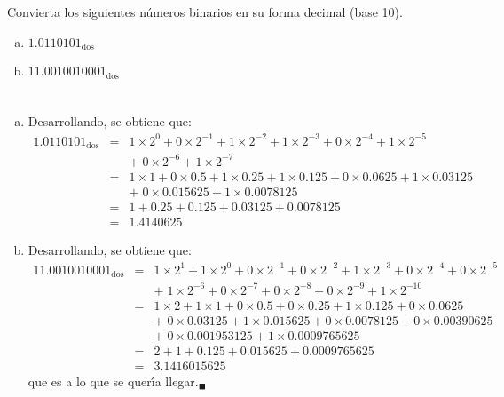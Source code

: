 \begin{enunciado}
 Convierta los siguientes n\'umeros binarios en su forma decimal (base 10).
 \begin{multicols}{2}
  \begin{enumerate}[(a)]
   \item $1.0110101_{\text{dos}}$
   \item $11.0010010001_{\text{dos}}$
  \end{enumerate}
 \end{multicols}
\end{enunciado}

\begin{solucion}
 $\phantom{0}$
 \begin{enumerate}[(a)]
  \item Desarrollando, se obtiene que:
  \begin{eqnarray*}
   1.0110101_{\text{dos}} & = & 1 \times 2^{0} + 0 \times 2^{-1} + 1 \times 2^{-2} + 1 \times 2^{-3} + 0 \times 2^{-4} + 1 \times 2^{-5} \\ 
   & & + \; 0 \times 2^{-6} + 1 \times 2^{-7} \\
   & = & 1 \times 1 + 0 \times 0.5 + 1 \times 0.25 + 1 \times 0.125 + 0 \times 0.0625 + 1 \times 0.03125 \\ 
   & & + \; 0 \times 0.015625 + 1 \times 0.0078125 \\
   & = & 1 + 0.25 + 0.125 + 0.03125 + 0.0078125 \\ 
   & = & 1.4140625 
  \end{eqnarray*}

  \item Desarrollando, se obtiene que:
  \begin{eqnarray*}
   11.0010010001_{\text{dos}} & = & 1 \times 2^{1} + 1 \times 2^{0} + 0 \times 2^{-1} + 0 \times 2^{-2} + 1 \times 2^{-3} + 0 \times 2^{-4} + 0 \times 2^{-5} \\ 
   & & + \; 1 \times 2^{-6} + 0 \times 2^{-7} + 0 \times 2^{-8} + 0 \times 2^{-9} + 1 \times 2^{-10} \\
   & = & 1 \times 2 + 1 \times 1 + 0 \times 0.5 + 0 \times 0.25 + 1 \times 0.125 + 0 \times 0.0625 \\
   & & + \; 0 \times 0.03125 + 1 \times 0.015625 + 0 \times 0.0078125 + 0 \times 0.00390625 \\
   & & + \; 0 \times 0.001953125 + 1 \times 0.0009765625 \\
   & = & 2 + 1 + 0.125 + 0.015625 + 0.0009765625 \\ 
   & = & 3.1416015625
  \end{eqnarray*}
  que es a lo que se quer\'{\i}a llegar.${}_{\blacksquare}$
 \end{enumerate}
\end{solucion}
